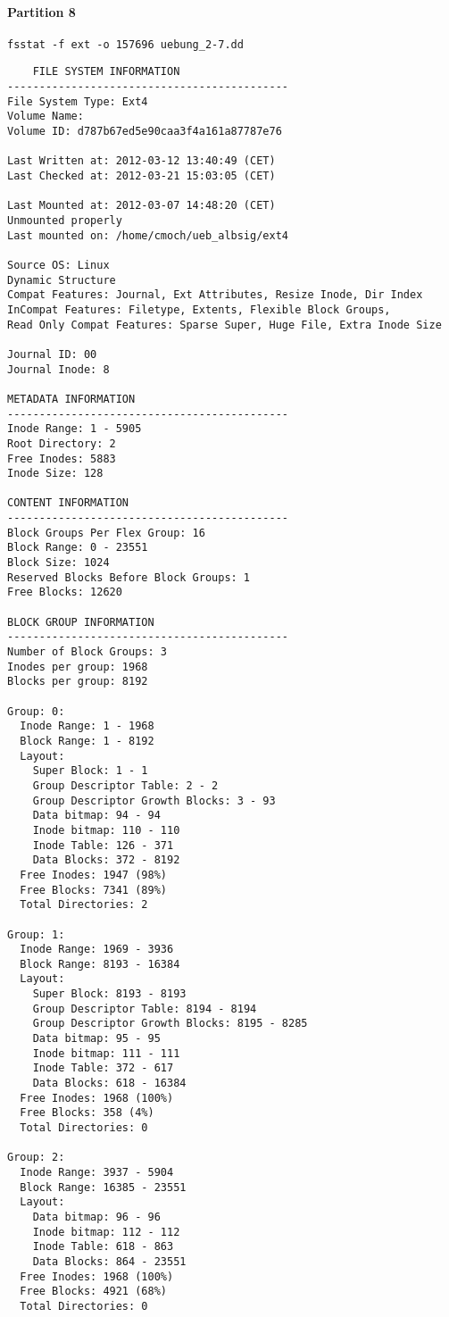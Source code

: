\documentclass[10pt,a4paper]{article}
\begin{document}
\paragraph{Partition 8}
\Verb+fsstat -f ext -o 157696 uebung_2-7.dd+
\begin{lstlisting}
    FILE SYSTEM INFORMATION
--------------------------------------------
File System Type: Ext4
Volume Name: 
Volume ID: d787b67ed5e90caa3f4a161a87787e76

Last Written at: 2012-03-12 13:40:49 (CET)
Last Checked at: 2012-03-21 15:03:05 (CET)

Last Mounted at: 2012-03-07 14:48:20 (CET)
Unmounted properly
Last mounted on: /home/cmoch/ueb_albsig/ext4

Source OS: Linux
Dynamic Structure
Compat Features: Journal, Ext Attributes, Resize Inode, Dir Index
InCompat Features: Filetype, Extents, Flexible Block Groups, 
Read Only Compat Features: Sparse Super, Huge File, Extra Inode Size

Journal ID: 00
Journal Inode: 8

METADATA INFORMATION
--------------------------------------------
Inode Range: 1 - 5905
Root Directory: 2
Free Inodes: 5883
Inode Size: 128

CONTENT INFORMATION
--------------------------------------------
Block Groups Per Flex Group: 16
Block Range: 0 - 23551
Block Size: 1024
Reserved Blocks Before Block Groups: 1
Free Blocks: 12620

BLOCK GROUP INFORMATION
--------------------------------------------
Number of Block Groups: 3
Inodes per group: 1968
Blocks per group: 8192

Group: 0:
  Inode Range: 1 - 1968
  Block Range: 1 - 8192
  Layout:
    Super Block: 1 - 1
    Group Descriptor Table: 2 - 2
    Group Descriptor Growth Blocks: 3 - 93
    Data bitmap: 94 - 94
    Inode bitmap: 110 - 110
    Inode Table: 126 - 371
    Data Blocks: 372 - 8192
  Free Inodes: 1947 (98%)
  Free Blocks: 7341 (89%)
  Total Directories: 2

Group: 1:
  Inode Range: 1969 - 3936
  Block Range: 8193 - 16384
  Layout:
    Super Block: 8193 - 8193
    Group Descriptor Table: 8194 - 8194
    Group Descriptor Growth Blocks: 8195 - 8285
    Data bitmap: 95 - 95
    Inode bitmap: 111 - 111
    Inode Table: 372 - 617
    Data Blocks: 618 - 16384
  Free Inodes: 1968 (100%)
  Free Blocks: 358 (4%)
  Total Directories: 0

Group: 2:
  Inode Range: 3937 - 5904
  Block Range: 16385 - 23551
  Layout:
    Data bitmap: 96 - 96
    Inode bitmap: 112 - 112
    Inode Table: 618 - 863
    Data Blocks: 864 - 23551
  Free Inodes: 1968 (100%)
  Free Blocks: 4921 (68%)
  Total Directories: 0
\end{lstlisting}
\end{document}
